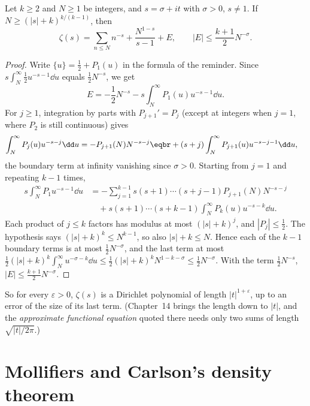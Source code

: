\begin{lemma}\label{lem:em}
Let $k\ge2$ and $N\ge1$ be integers, and $s=\sigma+it$ with $\sigma>0$, $s\ne1$. If $N\ge(|s|+k)^{k/(k-1)}$, then
\[
\zeta(s)=\sum_{n\le N}n^{-s}+\frac{N^{1-s}}{s-1}+E,\qquad|E|\le\frac{k+1}2N^{-\sigma}.
\]
\end{lemma}
\begin{proof}
Write $\{u\}=\frac12+P_1(u)$ in the formula of the reminder. Since $s\int_N^\infty\frac12u^{-s-1}\dd u$ equals $\frac12N^{-s}$, we get
\[
E=-\frac12N^{-s}-s\int_N^\infty P_1(u)u^{-s-1}\dd u.
\]
For $j\ge1$, integration by parts with $P_{j+1}'=P_j$ (except at integers when $j=1$, where $P_2$ is still continuous) gives
\[
\begin{aligned}\int_N^\infty P_j(u)u^{-s-j}\dd u&=-P_{j+1}(N)N^{-s-j}\eqbr+(s+j)\int_N^\infty P_{j+1}(u)u^{-s-j-1}\dd u,\end{aligned}
\]
the boundary term at infinity vanishing since $\sigma>0$. Starting from $j=1$ and repeating $k-1$ times,
\[
\begin{aligned}s\int_N^\infty P_1u^{-s-1}\dd u&=-\sum_{j=1}^{k-1}s(s+1)\cdots(s+j-1)P_{j+1}(N)N^{-s-j}\\&\quad+s(s+1)\cdots(s+k-1)\int_N^\infty P_k(u)u^{-s-k}\dd u.\end{aligned}
\]
Each product of $j\le k$ factors has modulus at most $(|s|+k)^j$, and $|P_j|\le\frac12$. The hypothesis says $(|s|+k)^k\le N^{k-1}$, so also $|s|+k\le N$. Hence each of the $k-1$ boundary terms is at most $\frac12N^{-\sigma}$, and the last term at most
$\frac12(|s|+k)^k\int_N^\infty u^{-\sigma-k}\dd u\le\frac12(|s|+k)^kN^{1-k-\sigma}\le\frac12N^{-\sigma}$. With the term $\frac12N^{-s}$, $|E|\le\frac{k+1}2N^{-\sigma}$.
\end{proof}

So for every $\varepsilon>0$, $\zeta(s)$ is a Dirichlet polynomial of length $|t|^{1+\varepsilon}$, up to an error of the size of its last term. (Chapter~14 brings the length down to $|t|$, and the \emph{approximate functional equation} quoted there needs only two sums of length $\sqrt{|t|/2\pi}$.)

\section{Mollifiers and Carlson's density theorem}

